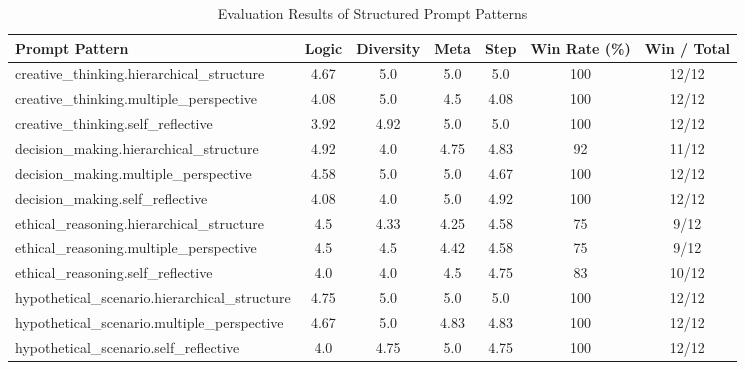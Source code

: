 \begin{table}[ht]
\centering
\caption{Evaluation Results of Structured Prompt Patterns}
\label{tab:prompt_evaluation}
\begin{tabular}{lcccccc}
\toprule
\textbf{Prompt Pattern} & \textbf{Logic} & \textbf{Diversity} & \textbf{Meta} & \textbf{Step} & \textbf{Win Rate (\%)} & \textbf{Win / Total} \\
\midrule
creative\_thinking.hierarchical\_structure & 4.67 & 5.0 & 5.0 & 5.0 & 100 & 12/12 \\
creative\_thinking.multiple\_perspective & 4.08 & 5.0 & 4.5 & 4.08 & 100 & 12/12 \\
creative\_thinking.self\_reflective & 3.92 & 4.92 & 5.0 & 5.0 & 100 & 12/12 \\
decision\_making.hierarchical\_structure & 4.92 & 4.0 & 4.75 & 4.83 & 92 & 11/12 \\
decision\_making.multiple\_perspective & 4.58 & 5.0 & 5.0 & 4.67 & 100 & 12/12 \\
decision\_making.self\_reflective & 4.08 & 4.0 & 5.0 & 4.92 & 100 & 12/12 \\
ethical\_reasoning.hierarchical\_structure & 4.5 & 4.33 & 4.25 & 4.58 & 75 & 9/12 \\
ethical\_reasoning.multiple\_perspective & 4.5 & 4.5 & 4.42 & 4.58 & 75 & 9/12 \\
ethical\_reasoning.self\_reflective & 4.0 & 4.0 & 4.5 & 4.75 & 83 & 10/12 \\
hypothetical\_scenario.hierarchical\_structure & 4.75 & 5.0 & 5.0 & 5.0 & 100 & 12/12 \\
hypothetical\_scenario.multiple\_perspective & 4.67 & 5.0 & 4.83 & 4.83 & 100 & 12/12 \\
hypothetical\_scenario.self\_reflective & 4.0 & 4.75 & 5.0 & 4.75 & 100 & 12/12 \\
\bottomrule
\end{tabular}
\end{table}

